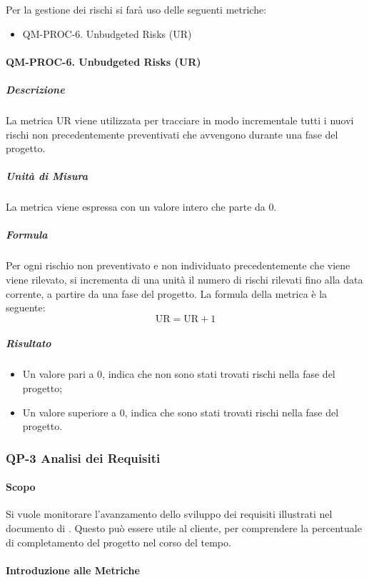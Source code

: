 		Per la gestione dei rischi si farà uso delle seguenti metriche:

		\begin{itemize}
			\item QM-PROC-6. Unbudgeted Risks (UR)
		\end{itemize}

		\paragraph{QM-PROC-6. Unbudgeted Risks (UR)}

			\subparagraph{Descrizione}
			La metrica UR viene utilizzata per tracciare in modo incrementale tutti i nuovi rischi non precedentemente preventivati che avvengono durante una fase del progetto.

			\subparagraph{Unità di Misura}
			La metrica viene espressa con un valore intero che parte da 0.

			\subparagraph{Formula}
			Per ogni rischio non preventivato e non individuato precedentemente che viene viene rilevato, si incrementa di una unità il numero di rischi rilevati fino alla data corrente, a partire da una fase del progetto.
			La formula della metrica è la seguente:
			\[
				\text{UR} = \text{UR} + 1
			\]

			\subparagraph{Risultato}
			\begin{itemize}
				\item Un valore pari a 0, indica che non sono stati trovati rischi nella fase del progetto;
				\item Un valore superiore a 0, indica che sono stati trovati rischi nella fase del progetto.
			\end{itemize}

	\subsubsection{QP-3 Analisi dei Requisiti}

		\paragraph{Scopo}

		Si vuole monitorare l'avanzamento dello sviluppo dei requisiti illustrati nel documento di . Questo può essere utile al cliente, per comprendere la percentuale di completamento del progetto nel corso del tempo.

		\paragraph{Introduzione alle Metriche}

